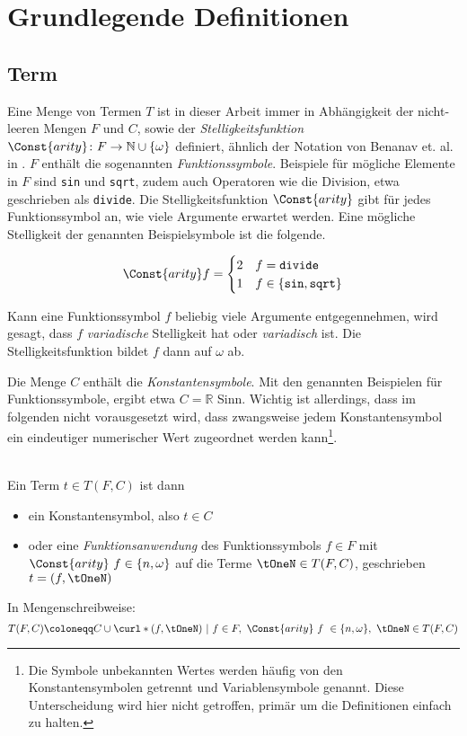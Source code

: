 


\chapter{Grundlegende Definitionen} \label{secGrundlegendeDefinitionen}

\section{Term} \label{subsecTerm}
Eine Menge von Termen $T$ ist in dieser Arbeit immer  in Abhängigkeit der nicht-leeren Mengen $F$ und $C$, sowie der \emph{Stelligkeitsfunktion} $\Const{arity} \colon F \rightarrow \mathbb{N} \cup \{\omega\}$ definiert, ähnlich der Notation von Benanav et. al. in \cite{NPHardMatching}. $F$ enthält die sogenannten \emph{Funktionssymbole}. Beispiele für mögliche Elemente in $F$ sind \texttt{sin} und \texttt{sqrt}, zudem auch Operatoren wie die Division, etwa geschrieben als \texttt{divide}. Die Stelligkeitsfunktion $\Const{arity}$ gibt für jedes Funktionssymbol an, wie viele Argumente erwartet werden. Eine mögliche Stelligkeit der genannten Beispielsymbole ist die folgende.

$$\Const{arity} f = \begin{cases}
2 & f  = \texttt{divide}\\
1 & f \in \{\texttt{sin}, \texttt{sqrt}\}\\
\end{cases}$$

Kann eine Funktionssymbol $f$ beliebig viele Argumente entgegennehmen, wird gesagt, dass $f$ \emph{variadische} Stelligkeit hat oder \emph{variadisch} ist. Die Stelligkeitsfunktion bildet $f$ dann auf $\omega$ ab. 

Die Menge $C$ enthält die \emph{Konstantensymbole}. Mit den genannten Beispielen für Funktionssymbole, ergibt etwa $C = \mathbb R$ Sinn. Wichtig ist allerdings, dass im folgenden nicht vorausgesetzt wird, dass zwangsweise jedem Konstantensymbol ein eindeutiger numerischer Wert zugeordnet werden kann\footnote{Die Symbole unbekannten Wertes werden häufig von den Konstantensymbolen getrennt und Variablensymbole genannt. Diese Unterscheidung wird hier nicht getroffen, primär um die Definitionen einfach zu halten.}.




\begin{definition}\label{defTerm}~\\
Ein Term $t \in T(F, C)$ ist dann  {
\begin{itemize}
	\item{ein Konstantensymbol, also $t \in C$}
	\item{oder eine \emph{Funktionsanwendung} des Funktionssymbols $f \in F$ mit $\Const{arity}~f \in \{n, \omega\}$ 
		auf die Terme ${\tOneN \in T(F, C)}$, geschrieben ${t = (f, \tOneN)}$}
\end{itemize}}
In Mengenschreibweise:
$$T(F, C) \coloneqq C \cup \curl*{
(f, \tOneN)~|
~f\in F,~\Const{arity}~f~ \in \{n, \omega\},~ \tOneN \in T(F, C)
}$$ 
\end{definition}


